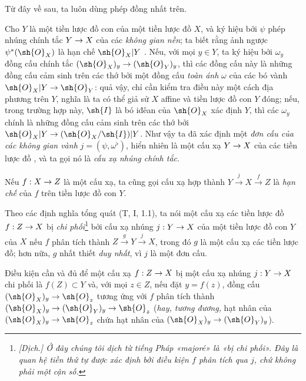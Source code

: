\documentclass[oneside]{amsart}
\makeatletter
\newcommand{\ega@arrow}[2]{\mathchoice{#1}{#2}{#2}{#2}}
\renewcommand{\to}{\ega@arrow{\longrightarrow}{\rightarrow}}
\let\EGAOriginalLabel\label
\renewcommand{\label}[1]{\phantomsection\EGAOriginalLabel{#1}}
\makeatother
\begin{document}
Từ đây về sau, ta luôn dùng phép đồng nhất trên.

\begin{env}[4.1.7]
\label{I.4.1.7}
Cho $Y$ là một tiền lược đồ con của một tiền lược đồ $X$, và ký hiệu bởi $\psi$ phép nhúng chính tắc $Y\to X$ của các \emph{không gian nền};
ta biết rằng ảnh ngược $\psi^*(\sh{O}_X)$ là hạn chế $\sh{O}_X|Y$ .
Nếu, với mọi $y\in Y$, ta ký hiệu bởi $\omega_y$ đồng cấu chính tắc $(\sh{O}_X)_y\to(\sh{O}_Y)_y$, thì các đồng cấu này là những đồng cấu cảm sinh trên các thớ bởi một đồng cấu \emph{toàn ánh} $\omega$ của các bó vành $\sh{O}_X|Y\to\sh{O}_Y$: quả vậy, chỉ cần kiểm tra điều này một cách địa phương trên $Y$, nghĩa là ta có thể giả sử $X$ affine và tiền lược đồ con $Y$ đóng; nếu, trong trường hợp này, $\sh{I}$ là bó iđêan của $\sh{O}_X$ xác định $Y$, thì các $\omega_y$ chính là những đồng cấu cảm sinh trên các thớ bởi $\sh{O}_X|Y\to(\sh{O}_X/\sh{I})|Y$.
Như vậy ta đã xác định một \emph{đơn cấu của các không gian vành}  $j=(\psi,\omega^\flat)$, hiển nhiên là một cấu xạ $Y\to X$ của các tiền lược đồ , và ta gọi nó là \emph{cấu xạ nhúng chính tắc}.

Nếu $f:X\to Z$ là một cấu xạ, ta cũng gọi cấu xạ hợp thành $Y\xrightarrow{j}X\xrightarrow{f}Z$ là \emph{hạn chế} của $f$ trên tiền lược đồ con $Y$.
\end{env}

\begin{env}[4.1.8]
\label{I.4.1.8}
Theo các định nghĩa tổng quát (T, I, 1.1), ta nói một cấu xạ các tiền lược đồ $f:Z\to X$ bị \emph{chi phối}\footnote{\emph{[Dịch.] Ở đây chúng tôi dịch từ tiếng Pháp «majoré» là «bị chi phối». Đây là quan hệ tiền thứ tự được xác định bởi điều kiện $f$ phân tích qua $j$, chứ không phải một cận số.}} bởi cấu xạ nhúng $j:Y\to X$ của một tiền lược đồ con $Y$ của $X$ nếu $f$ phân tích thành $Z\xrightarrow{g}Y\xrightarrow{j}X$, trong đó $g$ là một cấu xạ các tiền lược đồ;
hơn nữa, $g$ nhất thiết \emph{duy nhất}, vì $j$ là một đơn cấu.
\end{env}

\begin{proposition}[4.1.9]
\label{I.4.1.9}
Điều kiện cần và đủ để một cấu xạ $f:Z\to X$ bị một cấu xạ nhúng $j:Y\to X$ chi phối là $f(Z)\subset Y$ và, với mọi $z\in Z$, nếu đặt $y=f(z)$, đồng cấu $(\sh{O}_X)_y\to\sh{O}_z$ tương ứng với $f$ phân tích thành $(\sh{O}_X)_y\to(\sh{O}_Y)_y\to\sh{O}_z$ (\emph{hay, tương đương,} hạt nhân của $(\sh{O}_X)_y\to\sh{O}_z$ chứa hạt nhân của $(\sh{O}_X)_y\to(\sh{O}_Y)_y$).
\end{proposition}
\end{document}
